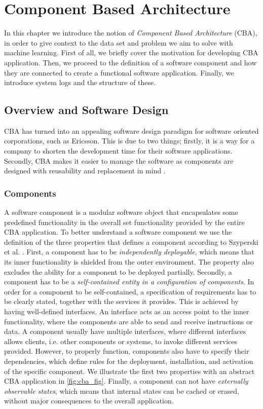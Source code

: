 \chapter{Component Based Architecture}
\label{chp_cba}
In this chapter we introduce the notion of \textit{Component Based Architecture} (CBA), in order to give context to the data set and problem we aim to solve with machine learning. First of all, we briefly cover the motivation for developing CBA application. Then, we proceed to the definition of a software component and how they are connected to create a functional software application. Finally, we introduce system logs and the structure of these.


\section{Overview and Software Design}
CBA has turned into an appealing software design paradigm for software oriented corporations, such as Ericsson. This is due to two things; firstly, it is a way for a company to shorten the development time for their software applications. Secondly, CBA makes it easier to manage the software as components are designed with reusability and replacement in mind \cite{ericssonCBA}.  


\subsection{Components}
A software component is a modular software object that encapsulates some predefined functionality in the overall set functionality provided by the entire CBA application. To better understand a software component we use the definition of the three properties that defines a component according to Szyperski et al. \cite{Szyperski:2002:CSB:515228}. First, a component has to be \textit{independently deployable}, which means that its inner functionality is shielded from the outer environment. The property also excludes the ability for a component to be deployed partially. Secondly, a component has to be a \textit{self-contained entity in a configuration of components}. In order for a component to be self-contained, a specification of requirements has to be clearly stated, together with the services it provides. This is achieved by having well-defined interfaces. An interface acts as an access point to the inner functionality, where the components are able to send and receive instructions or data. A component usually have multiple interfaces, where different interfaces allows clients, i.e. other components or systems, to invoke different services provided. However, to properly function, components also have to specify their dependencies, which define rules for the deployment, installation, and activation of the specific component. We illustrate the first two properties with an abstract CBA application in \autoref{fig:cba_fig}. Finally, a component can not have \textit{externally observable states}, which means that internal states can be cached or erased, without major consequences to the overall application. 



